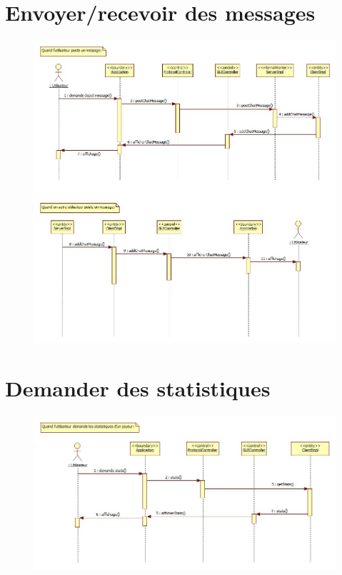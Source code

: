 \section{Envoyer/recevoir des messages}
\begin{figure}[ht]
	\centering \includegraphics[angle=90, width=\linewidth]{figures/DetailedChatSequenceDiagram.jpg}
\end{figure}
\clearpage
\section{Demander des statistiques}
\begin{figure}[ht]
	\centering \includegraphics[angle=90, width=.6\linewidth]{figures/DetailedStatSequenceDiagram.jpg}
\end{figure}
\clearpage
